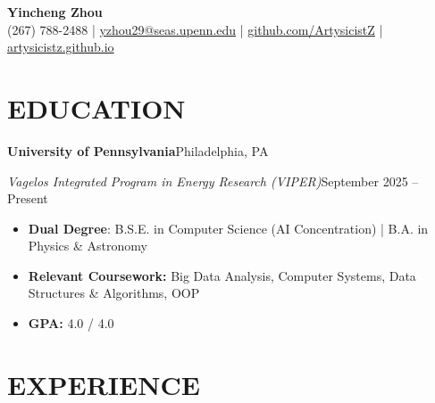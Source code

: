 \documentclass[10pt,letterpaper]{article}
\newcommand{\ressection}[1]{\section*{#1}}
\newcommand{\resheading}[4]{%
    \textbf{#1}\hfill #2\par
    \textit{#3}\hfill #4\par
}
\begin{document}
\fontsize{10.5pt}{11.8pt}\selectfont

\begin{center}
    {\LARGE \textbf{Yincheng Zhou}} \\[2pt]
    (267) 788-2488 | \href{mailto:yzhou29@seas.upenn.edu}{yzhou29@seas.upenn.edu} | \href{https://github.com/ArtysicistZ}{github.com/ArtysicistZ} | \href{https://artysicistz.github.io}{artysicistz.github.io}
\end{center}
\vspace{-8pt}

\ressection{EDUCATION}

\resheading{University of Pennsylvania}{Philadelphia, PA}{Vagelos Integrated Program in Energy Research (VIPER)}{September 2025 -- Present}
\begin{itemize}
    \item \textbf{Dual Degree}: B.S.E. in Computer Science (AI Concentration) | B.A. in Physics \& Astronomy
    \item \textbf{Relevant Coursework:} Big Data Analysis, Computer Systems, Data Structures \& Algorithms, OOP
    \item \textbf{GPA:} 4.0 / 4.0
\end{itemize}

\ressection{EXPERIENCE}
\end{document}
